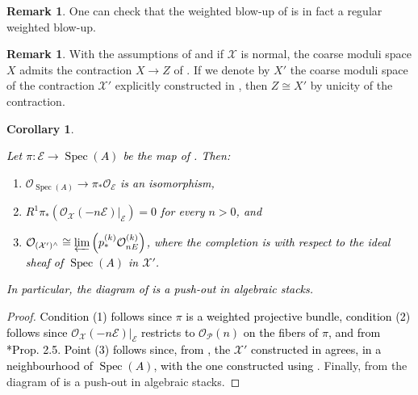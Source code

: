 \documentclass{amsart}
\newcommand{\cE}{\mathcal{E}}
\newcommand{\cO}{\mathcal{O}}
\newcommand{\cP}{\mathcal{P}}
\newcommand{\cX}{\mathcal{X}}
\newcommand{\spec}{\operatorname{Spec}}
\newtheorem{Cor}[theorem]{Corollary}
\theoremstyle{definition}
\newtheorem{Remark}[theorem]{Remark}
\begin{document}
\begin{Remark}
    One can check that the weighted blow-up of  is in fact a regular weighted blow-up.
\end{Remark}
\begin{Remark}\label{rmk_affine_case_is_the_same_as_Artin_case}
    With the assumptions of  and if $\cX$ is normal, the coarse moduli space $X$ admits the contraction $X\to Z$ of . If we denote by $X'$ the coarse moduli space of the contraction $\cX'$ explicitly constructed in , then $Z\cong X'$ by unicity of the contraction.\end{Remark}
\begin{Cor}\label{cor_conditions_are_satisfied_for_affine_cont_to_be_a_pushout}
    \textcolor{black}{Let $\pi:\cE\to \spec(A)$ be the map of . Then:
    \begin{enumerate}
        \item $\cO_{\spec(A)}\to \pi_*\cO_\cE$ is an isomorphism,
        \item $R^1\pi_*(\cO_{\cX}(-n\cE)|_\cE) = 0$ for every $n>0$, and
        \item $ \cO_{(\cX')^{\wedge}} \cong  \varprojlim\left(p^{(k)}_*\cO_{nE}^{(k)} \right)$, where the completion is with respect to the ideal sheaf of $\spec(A)$ in $\cX'$.
    \end{enumerate}
    In particular, the diagram of  is a push-out in algebraic stacks.}
\end{Cor}
\begin{proof}
    \textcolor{black}{Condition (1) follows since $\pi$ is a weighted projective bundle, condition (2) follows since $\cO_{\cX}(-n\cE)|_\cE$ restricts to $\cO_\cP(n)$ on the fibers of $\pi$, and from \cite{meier2015vector}*{Prop. 2.5}. Point (3) follows since, from , the $\cX'$ constructed in  agrees, in a neighbourhood of $\spec(A)$, with the one constructed using }. Finally, from  the diagram of  is a push-out in algebraic stacks.  
\end{proof}
\end{document}
